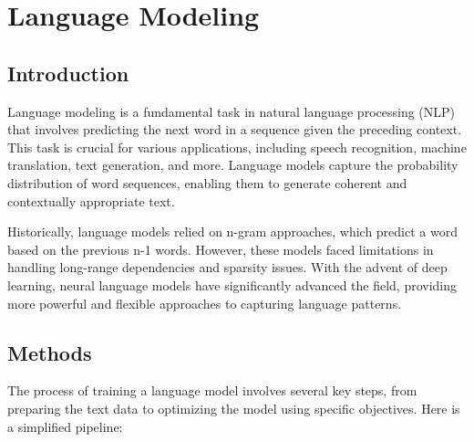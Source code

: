 \section{Language Modeling}


\subsection{Introduction}

Language modeling is a fundamental task in natural language processing (NLP) that involves predicting the next word in a sequence given the preceding context. This task is crucial for various applications, including speech recognition, machine translation, text generation, and more. Language models capture the probability distribution of word sequences, enabling them to generate coherent and contextually appropriate text.

Historically, language models relied on n-gram approaches, which predict a word based on the previous n-1 words. However, these models faced limitations in handling long-range dependencies and sparsity issues. With the advent of deep learning, neural language models have significantly advanced the field, providing more powerful and flexible approaches to capturing language patterns.

\subsection{Methods}

The process of training a language model involves several key steps, from preparing the text data to optimizing the model using specific objectives. Here is a simplified pipeline:

